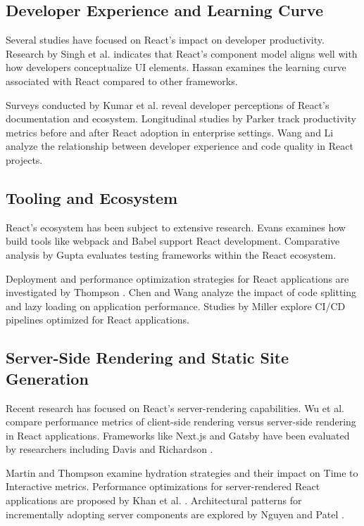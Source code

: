 \subsection{Developer Experience and Learning Curve}
Several studies have focused on React's impact on developer productivity. Research by Singh et al. \cite{singh2020} indicates that React's component model aligns well with how developers conceptualize UI elements. Hassan \cite{hassan2019} examines the learning curve associated with React compared to other frameworks.

Surveys conducted by Kumar et al. \cite{kumar2021} reveal developer perceptions of React's documentation and ecosystem. Longitudinal studies by Parker \cite{parker2020} track productivity metrics before and after React adoption in enterprise settings. Wang and Li \cite{wang2022} analyze the relationship between developer experience and code quality in React projects.

\subsection{Tooling and Ecosystem}
React's ecosystem has been subject to extensive research. Evans \cite{evans2020} examines how build tools like webpack \cite{webpack2012} and Babel \cite{babel2014} support React development. Comparative analysis by Gupta \cite{gupta2021} evaluates testing frameworks within the React ecosystem.

Deployment and performance optimization strategies for React applications are investigated by Thompson \cite{thompson2021}. Chen and Wang \cite{chen2021} analyze the impact of code splitting and lazy loading on application performance. Studies by Miller \cite{miller2022} explore CI/CD pipelines optimized for React applications.

\subsection{Server-Side Rendering and Static Site Generation}
Recent research has focused on React's server-rendering capabilities. Wu et al. \cite{wu2020} compare performance metrics of client-side rendering versus server-side rendering in React applications. Frameworks like Next.js \cite{nextjs2016} and Gatsby \cite{gatsby2017} have been evaluated by researchers including Davis \cite{davis2019} and Richardson \cite{richardson2021}.

Martin and Thompson \cite{martin2020} examine hydration strategies and their impact on Time to Interactive metrics. Performance optimizations for server-rendered React applications are proposed by Khan et al. \cite{khan2022}. Architectural patterns for incrementally adopting server components are explored by Nguyen and Patel \cite{nguyen2022}.

